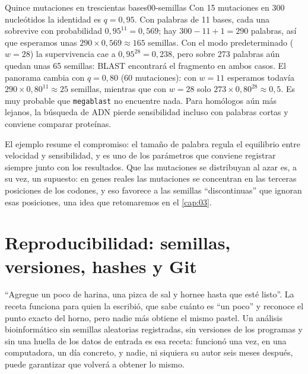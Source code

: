 \begin{ejemplo}{Quince mutaciones en trescientas bases}{00-semillas}
Con 15 mutaciones en 300 nucleótidos la identidad es $q=0{,}95$. Con palabras de 11 bases, cada una sobrevive con probabilidad $0{,}95^{11}=0{,}569$; hay $300-11+1=290$ palabras, así que esperamos unas $290\times0{,}569\approx165$ semillas. Con el modo predeterminado ($w=28$) la supervivencia cae a $0{,}95^{28}=0{,}238$, pero sobre 273 palabras aún quedan unas 65 semillas: BLAST encontrará el fragmento en ambos casos. El panorama cambia con $q=0{,}80$ (60 mutaciones): con $w=11$ esperamos todavía $290\times0{,}80^{11}\approx25$ semillas, mientras que con $w=28$ solo $273\times0{,}80^{28}\approx0{,}5$. Es muy probable que \texttt{megablast} no encuentre nada. Para homólogos aún más lejanos, la búsqueda de ADN pierde sensibilidad incluso con palabras cortas y conviene comparar proteínas.
\end{ejemplo}


El ejemplo resume el compromiso: el tamaño de palabra regula el equilibrio entre velocidad y sensibilidad, y es uno de los parámetros que conviene registrar siempre junto con los resultados. Que las mutaciones se distribuyan al azar es, a su vez, un supuesto: en genes reales las mutaciones se concentran en las terceras posiciones de los codones, y eso favorece a las semillas ``discontinuas'' que ignoran esas posiciones, una idea que retomaremos en el \cref{cap:03}.

\section{Reproducibilidad: semillas, versiones, hashes y Git}\label{sec:00-reproducibilidad}

\begin{intuicion}
``Agregue un poco de harina, una pizca de sal y hornee hasta que esté listo''. La receta funciona para quien la escribió, que sabe cuánto es ``un poco'' y reconoce el punto exacto del horno, pero nadie más obtiene el mismo pastel. Un análisis bioinformático sin semillas aleatorias registradas, sin versiones de los programas y sin una huella de los datos de entrada es esa receta: funcionó una vez, en una computadora, un día concreto, y nadie, ni siquiera su autor seis meses después, puede garantizar que volverá a obtener lo mismo.
\end{intuicion}

